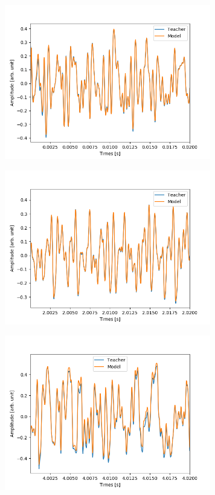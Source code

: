 \documentclass{jreport}		%
\begin{document}
\begin{figure}[htbp]
 \begin{minipage}{0.5\hsize}
 \begin{center}
  \includegraphics[width=90mm]{gain5_output_hikaku.png}
 \end{center}
 \label{fig:one}
 \end{minipage}
 \begin{minipage}{0.5\hsize}
 \begin{center}
  \includegraphics[width=90mm]{gain5_output_hikaku2.png}
 \end{center}
 \label{fig:two}
 \end{minipage}
 \begin{minipage}{0.5\hsize}
 \begin{center}
  \includegraphics[width=90mm]{gain5_output_hikaku3.png}

\end{center}
\end{minipage}
\end{figure}
\end{document}
